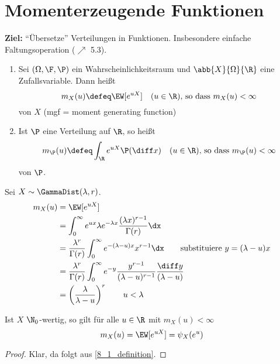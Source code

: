 \section{Momenterzeugende Funktionen}
\textbf{Ziel:} ``Übersetze'' Verteilungen in Funktionen. Insbesondere einfache Faltungsoperation ($\nearrow$ 5.3). 

\begin{definition}
	\label{8_1_definition}
	\begin{enumerate}[leftmargin=*, nolistsep]
		\item Sei $(\Omega,\F,\P)$ ein Wahrscheinlichkeitsraum und $\abb{X}{\Omega}{\R}$ eine Zufallsvariable. Dann heißt
		\begin{equation*}
			m_X(u) \defeq \EW[e^{uX}] \quad (u \in \R) \text{, so dass } m_X(u) < \infty
		\end{equation*}
		 von $X$ (mgf = moment generating function)
		\item Ist $\P$ eine Verteilung auf $\R$, so heißt
		\begin{equation*}
			m_{\P}(u) \defeq \int_{\R} e^{uX} \P(\diff x) \quad (u \in \R) \text{, so dass } m_{\P}(u) < \infty
		\end{equation*}
		 von $\P$.
	\end{enumerate}
\end{definition}

\begin{beispiel}
	\label{8_2_beispiel}
	Sei $X \sim \GammaDist(\lambda,r)$.
	\begin{align*}
		m_X(u) &= \EW[e^{uX}]\\
		&= \int_{0}^{\infty} e^{ux}\lambda e^{-\lambda x}\frac{(\lambda x)^{r-1}}{\Gamma(r)}\dx\\
		&= \frac{\lambda^r}{\Gamma(r)} \int_{0}^{\infty} e^{-(\lambda-u)x} x^{r-1}\dx \qquad \text{substituiere } y= (\lambda-u)x \\
		&= \frac{\lambda^r}{\Gamma(r)} \int_0^{\infty} e^{-y}\frac{y^{r-1}}{(\lambda-u)^{r-1}}\frac{\diff y}{(\lambda-u)} \\
		&= \left( \frac{\lambda}{\lambda-u} \right)^r \qquad u < \lambda
	\end{align*}
\end{beispiel}

\begin{lemma}
	\label{8_3_lemma}
	Ist $X$ $\N_0$-wertig, so gilt für alle $u \in \R$ mit $m_X(u) < \infty$
	\begin{equation*}
		m_X(u) = \EW[e^{uX}] = \psi_X(e^u)
	\end{equation*}
\end{lemma}
\begin{proof}
	Klar, da folgt aus \cref{8_1_definition}.
\end{proof}

